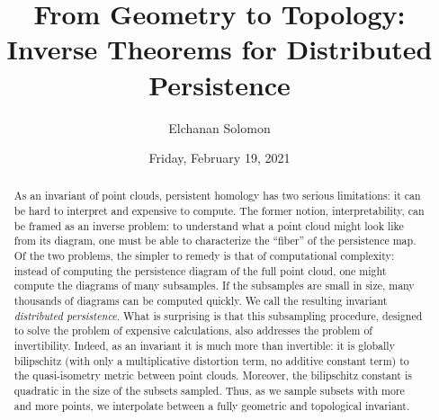 \documentclass{UAmathtalk}
\author{Elchanan Solomon}
\title{From Geometry to Topology: Inverse Theorems for Distributed Persistence}
\date{Friday, February 19, 2021}
\begin{document}
\maketitle

\begin{abstract}
As an invariant of point clouds, persistent homology has two serious limitations: it can be hard to interpret and expensive to compute. The former notion, interpretability, can be framed as an inverse problem: to understand what a point cloud might look like from its diagram, one must be able to characterize the ``fiber'' of the persistence map. Of the two problems, the simpler to remedy is that of computational complexity: instead of computing the persistence diagram of the full point cloud, one might compute the diagrams of many subsamples. If the subsamples are small in size, many thousands of diagrams can be computed quickly. We call the resulting invariant \emph{distributed persistence}. What is surprising is that this subsampling procedure, designed to solve the problem of expensive calculations, also addresses the problem of invertibility. Indeed, as an invariant it is much more than invertible: it is globally bilipschitz (with only a multiplicative distortion term, no additive constant term) to the quasi-isometry metric between point clouds. Moreover, the bilipschitz constant is quadratic in the size of the subsets sampled. Thus, as we sample subsets with more and more points, we interpolate between a fully geometric and topological invariant.
\end{abstract}
\end{document}
